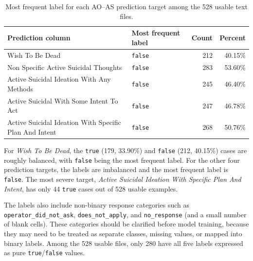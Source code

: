\documentclass{article}
\begin{document}
  \begin{table}[htbp]
  \centering
  \small
  \begin{tabular}{llrr}
  \toprule
  \textbf{Prediction column} & \textbf{Most frequent label} & \textbf{Count} & \textbf{Percent} \\
  \midrule
  Wish To Be Dead & \texttt{false} & 212 & 40.15\% \\
  Non Specific Active Suicidal Thoughts & \texttt{false} & 283 & 53.60\% \\
  Active Suicidal Ideation With Any Methods & \texttt{false} & 245 & 46.40\% \\
  Active Suicidal With Some Intent To Act & \texttt{false} & 247 & 46.78\% \\
  Active Suicidal Ideation With Specific Plan And Intent & \texttt{false} & 268 & 50.76\% \\
  \bottomrule
  \end{tabular}
  \caption{Most frequent label for each AO--AS prediction target among the 528 usable text files.}
  \label{tab:label-distribution-summary}
  \end{table}

  For \textit{Wish To Be Dead}, the \texttt{true} (179, 33.90\%) and \texttt{false} (212, 40.15\%) cases are roughly balanced, with \texttt{false} being the most frequent
  label. For the other four prediction targets, the labels are imbalanced and the most frequent label is \texttt{false}. The most severe target,
  \textit{Active Suicidal Ideation With Specific Plan And Intent}, has only 44 \texttt{true} cases out of 528 usable examples.

  The labels also include non-binary response categories such as \texttt{operator\_did\_not\_ask}, \texttt{does\_not\_apply}, and \texttt{no\_response} (and a small
  number of blank cells). These categories should be clarified before model training, because they may need to be treated as separate classes, missing values, or mapped
  into binary labels. Among the 528 usable files, only 280 have all five labels expressed as pure \texttt{true}/\texttt{false} values.
\end{document}

